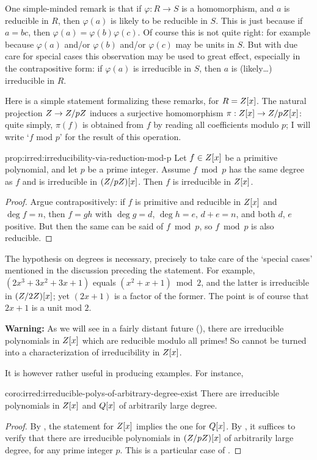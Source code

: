 One simple-minded remark is that if $\varphi : R \to S$ is a
homomorphism, and $a$ is reducible in $R$, then $\varphi(a)$ is likely
to be reducible in $S$. This is just because if $a = bc$, then
$\varphi(a) = \varphi(b)\varphi(c)$. Of course this is not quite
right: for example because $\varphi(a)$ and/or $\varphi(b)$ and/or
$\varphi(c)$ may be units in $S$. But with due care for special cases
this observation may be used to great effect, especially in the
contrapositive form: if $\varphi(a)$ is irreducible in $S$, then $a$
is (likely\dots) irreducible in $R$.

Here is a simple statement formalizing these remarks, for $R = Z[x]$.
The natural projection $Z \to Z/pZ$ induces a surjective
homomorphism $\pi : Z[x] \to Z/pZ[x]$: quite simply, $\pi(f)$ is
obtained from $f$ by reading all coefficients modulo $p$; I will write
`$f$ mod $p$' for the result of this operation.
\begin{prop}{}{prop:irred:irreducibility-via-reduction-mod-p}
  Let $f \in Z[x]$ be a primitive polynomial, and let $p$ be a prime
  integer. Assume $f \bmod p$ has the same degree as $f$ and is
  irreducible in $(Z/pZ)[x]$. Then $f$ is irreducible in $Z[x]$.
\end{prop}
\begin{proof}
  Argue contrapositively: if $f$ is primitive and reducible in $Z[x]$
  and $\deg f = n$, then $f = gh$ with $\deg g = d$, $\deg h = e$,
  $d + e = n$, and both $d$, $e$ positive. But then the same can be
  said of $f \bmod p$, so $f \bmod p$ is also reducible.
\end{proof}
The hypothesis on degrees is necessary, precisely to take care of the
`special cases' mentioned in the discussion preceding the
statement. For example, $(2x^3 + 3x^2 + 3x + 1)$ equals
$(x^2 + x + 1) \bmod 2$, and the latter is irreducible in
$(Z/2Z)[x]$; yet $(2x + 1)$ is a factor of the former. The point is
of course that $2x + 1$ is a unit mod $2$.

\textbf{Warning:} As we will see in a fairly distant future
(), there are irreducible polynomials in
$Z[x]$ which are reducible modulo all primes! So
 cannot be turned into a characterization of
irreducibility in $Z[x]$.

It is however rather useful in producing examples. For instance,

\begin{coro}{}{coro:irred:irreducible-polys-of-arbitrary-degree-exist}
  There are irreducible polynomials in $Z[x]$ and $Q[x]$ of
  arbitrarily large degree.
\end{coro}
\begin{proof}
  By , the statement for $Z[x]$ implies the one
  for $Q[x]$. By , it suffices to verify that
  there are irreducible polynomials in $(Z/pZ)[x]$ of arbitrarily
  large degree, for any prime integer $p$. This is a particular case
  of .
\end{proof}

